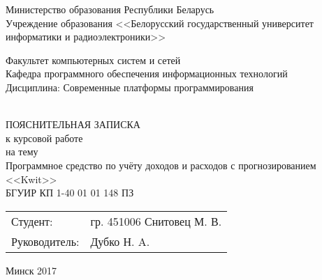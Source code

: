 \begin{titlepage}
  \begin{center}
    Министерство образования Республики Беларусь\\[0.4em]
    Учреждение образования <<Белорусский государственный университет информатики
    и радиоэлектроники>>\\[3.5em]

    \begin{minipage}{\textwidth}
      \begin{center}
          Факультет компьютерных систем и сетей\\[1em]
          Кафедра программного обеспечения информационных технологий\\[1em]
          Дисциплина: Современные платформы программирования
      \end{center}
    \end{minipage}\\[3em]
    ПОЯСНИТЕЛЬНАЯ ЗАПИСКА\\
    к курсовой работе\\
    на тему\\[1em]
    Программное средство по учёту доходов и расходов с прогнозированием \\ <<Kwit>>\\[1em]
    БГУИР КП 1-40 01 01 148 ПЗ
    \vspace{8em}

    \begin{flushright}
        \begin{minipage}{10cm}
        	\begin{tabular}{p{3cm} p{6.1cm}} 
        	Студент: & гр. 451006 Снитовец М. В. \\[1.4em]
            Руководитель: & Дубко Н. A.
            \end{tabular}
        \end{minipage}
    \end{flushright}

    \vfill
    {\normalsize Минск 2017}
  \end{center}
\end{titlepage}
